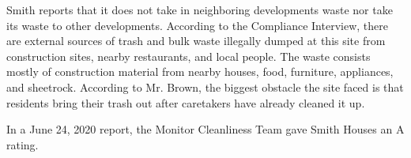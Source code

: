 Smith reports that it does not take in neighboring developments waste nor take its waste to other developments. According to the Compliance Interview, there are external sources of trash and bulk waste illegally dumped at this site from construction sites, nearby restaurants, and local people. The waste consists mostly of construction material from nearby houses, food, furniture, appliances, and sheetrock. According to Mr. Brown, the biggest obstacle the site faced is that residents bring their trash out after caretakers have already cleaned it up. 

 

In a June 24, 2020 report, the Monitor Cleanliness Team gave Smith Houses an A rating.  

 
